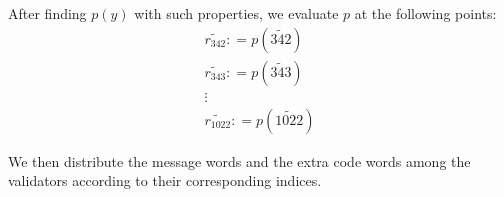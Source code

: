 After finding $p(y)$ with such properties, we evaluate $p$ at the following points:
\begin{equation}
   \begin{array}{l}
     \widetilde{r_{342}} : = p (\widetilde{342})\\
     \widetilde{r_{343}} : = p (\widetilde{343})\\
     \vdots\\
     \widetilde{r_{1022}} : = p (\widetilde{1022})
   \end{array}
\end{equation}

We then distribute the message words and the extra code words among the validators according to their corresponding indices.







